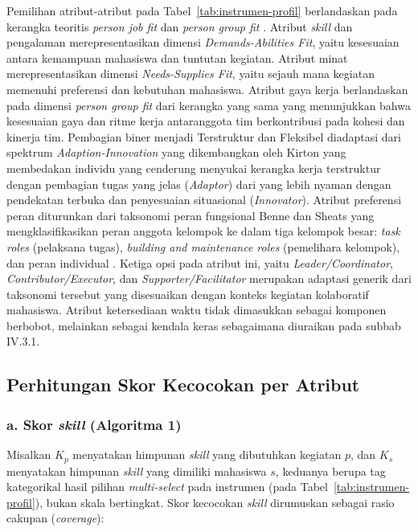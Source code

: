 Pemilihan atribut-atribut pada Tabel~\ref{tab:instrumen-profil} berlandaskan pada kerangka teoritis \emph{person job fit} dan \emph{person group fit} \autocite{kristofbrown2005}. Atribut \emph{skill} dan pengalaman merepresentasikan dimensi \emph{Demands-Abilities Fit}, yaitu kesesuaian antara kemampuan mahasiswa dan tuntutan kegiatan. Atribut minat merepresentasikan dimensi \emph{Needs-Supplies Fit}, yaitu sejauh mana kegiatan memenuhi preferensi dan kebutuhan mahasiswa. Atribut gaya kerja berlandaskan pada dimensi \emph{person group fit} dari kerangka yang sama yang menunjukkan bahwa kesesuaian gaya dan ritme kerja antaranggota tim berkontribusi pada kohesi dan kinerja tim. Pembagian biner menjadi Terstruktur dan Fleksibel diadaptasi dari spektrum \emph{Adaption-Innovation} yang dikembangkan oleh Kirton \autocite{stum2009} yang membedakan individu yang cenderung menyukai kerangka kerja terstruktur dengan pembagian tugas yang jelas (\emph{Adaptor}) dari yang lebih nyaman dengan pendekatan terbuka dan penyesuaian situasional (\emph{Innovator}). Atribut preferensi peran diturunkan dari taksonomi peran fungsional Benne dan Sheats yang mengklasifikasikan peran anggota kelompok ke dalam tiga kelompok besar: \emph{task roles} (pelaksana tugas), \emph{building and maintenance roles} (pemelihara kelompok), dan peran individual \autocite{burke2019}. Ketiga opsi pada atribut ini, yaitu \emph{Leader/Coordinator}, \emph{Contributor/Executor}, dan \emph{Supporter/Facilitator} merupakan adaptasi generik dari taksonomi tersebut yang disesuaikan dengan konteks kegiatan kolaboratif mahasiswa. Atribut ketersediaan waktu tidak dimasukkan sebagai komponen berbobot, melainkan sebagai kendala keras sebagaimana diuraikan pada subbab IV.3.1.

\subsection{Perhitungan Skor Kecocokan per Atribut}

\subsubsection*{a. Skor \emph{skill} (Algoritma 1)}

Misalkan $K_p$ menyatakan himpunan \emph{skill} yang dibutuhkan kegiatan $p$, dan $K_s$ menyatakan himpunan \emph{skill} yang dimiliki mahasiswa $s$, keduanya berupa tag kategorikal hasil pilihan \emph{multi-select} pada instrumen (pada Tabel~\ref{tab:instrumen-profil}), bukan skala bertingkat. Skor kecocokan \emph{skill} dirumuskan sebagai rasio cakupan (\emph{coverage}):

